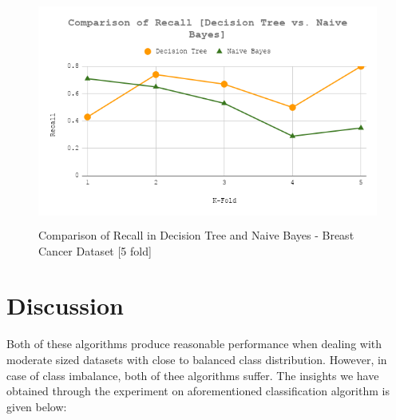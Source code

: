 \documentclass[12pt]{article}
\begin{document}
\begin{figure}[H]
	\centering
	\includegraphics[width = .8\columnwidth, height = 7.5cm]{Recall.png}
	\caption{Comparison of Recall in Decision Tree and Naive Bayes - Breast Cancer Dataset [5 fold]}
	\label{fig:rec}
\end{figure}


\section{Discussion}
Both of these algorithms produce reasonable performance when dealing with moderate sized datasets with close to balanced class distribution. However, in case of class imbalance, both of thee algorithms suffer. The insights we have obtained through the experiment on aforementioned classification algorithm is given below:
\end{document}
